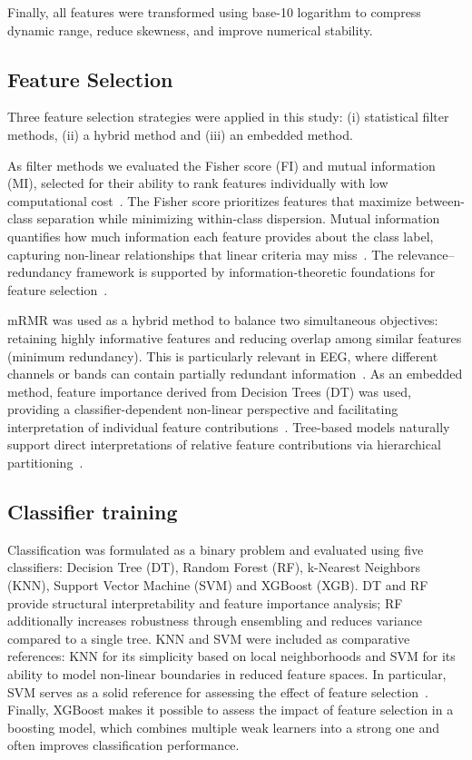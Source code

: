 \documentclass[lettersize,journal]{IEEEtran}
\begin{document}
Finally, all features were transformed using base-10 logarithm to compress dynamic range, reduce skewness, and improve numerical stability.

\subsection{Feature Selection}
Three feature selection strategies were applied in this study: (i) statistical filter methods, (ii) a hybrid method and (iii) an embedded method.

As filter methods we evaluated the Fisher score (FI) and mutual information (MI), selected for their ability to rank features individually with low computational cost~\cite{Fisher1936}. The Fisher score prioritizes features that maximize between-class separation while minimizing within-class dispersion. Mutual information quantifies how much information each feature provides about the class label, capturing non-linear relationships that linear criteria may miss~\cite{Shannon1948}. The relevance–redundancy framework is supported by information-theoretic foundations for feature selection~\cite{CoverThomas2006}.

mRMR was used as a hybrid method to balance two simultaneous objectives: retaining highly informative features and reducing overlap among similar features (minimum redundancy). This is particularly relevant in EEG, where different channels or bands can contain partially redundant information~\cite{Peng2005}. As an embedded method, feature importance derived from Decision Trees (DT) was used, providing a classifier-dependent non-linear perspective and facilitating interpretation of individual feature contributions~\cite{Breiman2001}. Tree-based models naturally support direct interpretations of relative feature contributions via hierarchical partitioning~\cite{Breiman1984}.


\subsection{Classifier training}
Classification was formulated as a binary problem and evaluated using five classifiers: Decision Tree (DT), Random Forest (RF), k-Nearest Neighbors (KNN), Support Vector Machine (SVM) and XGBoost (XGB). DT and RF provide structural interpretability and feature importance analysis; RF additionally increases robustness through ensembling and reduces variance compared to a single tree. KNN and SVM were included as comparative references: KNN for its simplicity based on local neighborhoods and SVM for its ability to model non-linear boundaries in reduced feature spaces. In particular, SVM serves as a solid reference for assessing the effect of feature selection~\cite{Cortes1995}. Finally, XGBoost makes it possible to assess the impact of feature selection in a boosting model, which combines multiple weak learners into a strong one and often improves classification performance.
\end{document}
